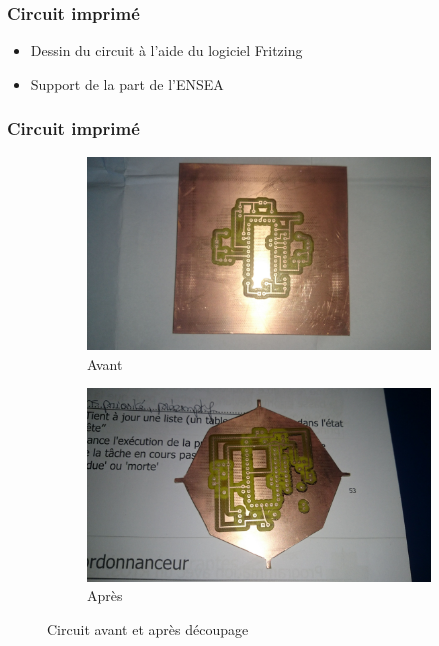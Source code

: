 \documentclass{beamer}
\begin{document}
{	\begin{frame}
	  \frametitle{Circuit imprimé}
	  
	  \begin{itemize}
	    \item Dessin du circuit à l'aide du logiciel Fritzing
	    \item Support de la part de l'ENSEA
	  \end{itemize}
	\end{frame}
	
	\begin{frame}
	  \frametitle{Circuit imprimé}
	
	    \begin{figure}
	      \begin{subfigure}{.5\textwidth}
		\centering
		\includegraphics[scale=0.04]{img/carte_avant.jpg}
		\caption{Avant}
		\label{fig:sfig1}
	      \end{subfigure}%
	      \begin{subfigure}{.5\textwidth}
		\centering
		\includegraphics[scale=0.04]{img/carte_apres.jpg}
		\caption{Après}
		\label{fig:sfig2}
	      \end{subfigure}
	      \caption{Circuit avant et après découpage}
	      \label{fig:fig}
	    \end{figure}
	  \end{frame}
	
}
\end{document}

